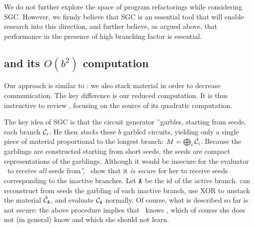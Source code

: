 We do not further explore the space of program refactorings while
considering SGC.
However, we firmly believe that SGC is an essential tool that will
enable research into this direction, and further believe, as argued
above, that performance in the presence of high branching factor is
essential.





 




\subsection{\HK and its $O(b^2)$ computation}
\label{sec:bsquaredcost}

Our approach is similar to \HK: we also stack material in
order to decrease communication.
The key difference is our reduced computation.
It is thus instructive to review \HK,
focusing on the source of its quadratic computation.

The key idea of SGC is that the circuit generator \G\ garbles,
starting from seeds, each branch $\mathcal C_i$.
He then \emph{stacks} these $b$ garbled circuits, yielding only a
single piece of material proportional to the longest branch: $M =
\bigoplus_i \hat{\mathcal C}_i$.
Because the garblings are constructed starting from short seeds, the
seeds are compact representations of the garblings.
%
Although it would be insecure for the evaluator \E\ to receive
\emph{all} seeds from \G, \HK\ show that it \emph{is secure} for her
to receive seeds corresponding to the inactive branches.
Let $\mathtt{A}$ be the id of the active branch.
\E can reconstruct from seeds the garbling of each inactive branch, use XOR to unstack
the material $\hat{\mathcal C}_{\mathtt{A}}$, and evaluate $\mathcal C_{\mathtt{A}}$ normally.
%
Of course, what is described so far is not secure: the above procedure
implies that \E\ knows \aid, which of course she does not (in general)
know and which she should not learn.


